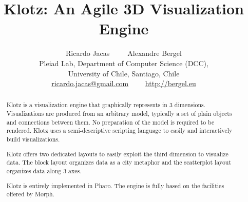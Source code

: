 \documentclass{sig-alternate}
\newcommand{\Title}{Klotz: An Agile 3D Visualization Engine}
\newcommand{\Authors}{Ricardo Jacas~~~~~Alexandre Bergel}
\newcommand{\AuthorsShort}{R. Jacas, A. Bergel}
\begin{document}


\title{\Title}

\author{\Authors\\
Pleiad Lab, Department of Computer Science (DCC),\\ University of Chile, Santiago, Chile\\ [1 ex]
\url{ricardo.jacas@gmail.com}~~~~
\url{http://bergel.eu}
}




\newcommand{\spp}{~~~~~~~}

\maketitle


\begin{abstract}
Klotz is a visualization engine that graphically represents in 3 dimensions. Visualizations are produced from an arbitrary model, typically a set of plain objects and connections between them. No preparation of the model is required to be rendered.
Klotz uses a semi-descriptive scripting language to easily and interactively build visualizations. 

Klotz offers two dedicated layouts to easily exploit the third dimension to visualize data. The block layout organizes data as a city metaphor and the scatterplot layout organizes data along 3 axes.

Klotz is entirely implemented in Pharo. The engine is fully based on the facilities offered by Morph.
\end{abstract}
\end{document}
